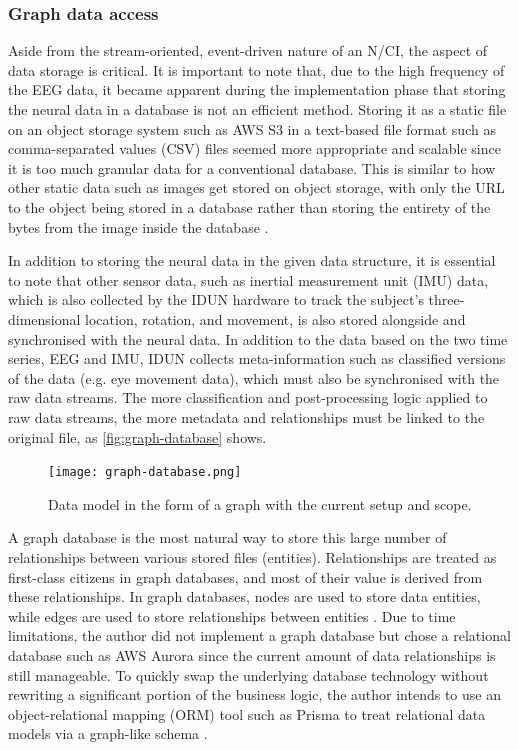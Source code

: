\subsubsection{Graph data access}
\label{chapter5-graph-data-access}

Aside from the stream-oriented, event-driven nature of an N/CI, the aspect of data storage is critical. It is important to note that, due to the high frequency of the EEG data, it became apparent during the implementation phase that storing the neural data in a database is not an efficient method. Storing it as a static file on an object storage system such as AWS S3 in a text-based file format such as comma-separated values (CSV) files seemed more appropriate and scalable since it is too much granular data for a conventional database. This is similar to how other static data such as images get stored on object storage, with only the URL to the object being stored in a database rather than storing the entirety of the bytes from the image inside the database \citep{datanamic_store_nodate}.

In addition to storing the neural data in the given data structure, it is essential to note that other sensor data, such as inertial measurement unit (IMU) data, which is also collected by the IDUN hardware to track the subject’s three-dimensional location, rotation, and movement, is also stored alongside and synchronised with the neural data. In addition to the data based on the two time series, EEG and IMU, IDUN collects meta-information such as classified versions of the data (e.g. eye movement data), which must also be synchronised with the raw data streams. The more classification and post-processing logic applied to raw data streams, the more metadata and relationships must be linked to the original file, as \autoref{fig:graph-database} shows.

\begin{figure}[!ht]
  \centering
  \texttt{[image: graph-database.png]}
  \caption{Data model in the form of a graph with the current setup and scope.}
  \label{fig:graph-database}
\end{figure}

A graph database is the most natural way to store this large number of relationships between various stored files (entities). Relationships are treated as first-class citizens in graph databases, and most of their value is derived from these relationships. In graph databases, nodes are used to store data entities, while edges are used to store relationships between entities \citep{amazon_web_services_inc_what_nodate}. Due to time limitations, the author did not implement a graph database but chose a relational database such as AWS Aurora since the current amount of data relationships is still manageable. To quickly swap the underlying database technology without rewriting a significant portion of the business logic, the author intends to use an object-relational mapping (ORM) tool such as Prisma to treat relational data models via a graph-like schema \citep{prisma_data_nodate}.

